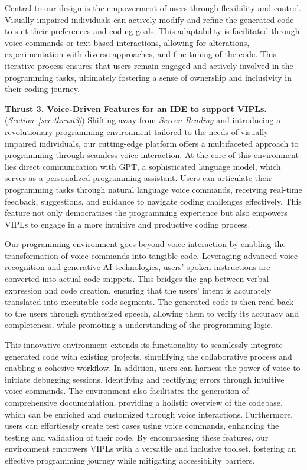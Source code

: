 Central to our design is the empowerment of users through flexibility
and control. Visually-impaired individuals can actively modify and
refine the generated code to suit their preferences and coding
goals. This adaptability is facilitated through voice commands or
text-based interactions, allowing for alterations, experimentation
with diverse approaches, and fine-tuning of the code. This iterative
process ensures that users remain engaged and actively involved in the
programming tasks, ultimately fostering a sense of ownership and
inclusivity in their coding journey.

\vspace{3pt}
\noindent \textbf{Thrust 3. Voice-Driven Features for an IDE to
  support VIPLs.} ({\em Section~\ref{sec:thrust3}}) Shifting away from
          {\em Screen Reading} and introducing a revolutionary
          programming environment tailored to the needs of
          visually-impaired individuals, our cutting-edge platform
          offers a multifaceted approach to programming through
          seamless voice interaction. At the core of this environment
          lies direct communication with GPT, a sophisticated language
          model, which serves as a personalized programming
          assistant. Users can articulate their programming tasks
          through natural language voice commands, receiving real-time
          feedback, suggestions, and guidance to navigate coding
          challenges effectively. This feature not only democratizes
          the programming experience but also empowers VIPLs to engage
          in a more intuitive and productive coding process.

Our programming environment goes beyond voice interaction by enabling
the transformation of voice commands into tangible code. Leveraging
advanced voice recognition and generative AI technologies, users'
spoken instructions are converted into actual code snippets. This
bridges the gap between verbal expression and code creation, ensuring
that the users' intent is accurately translated into executable code
segments. The generated code is then read back to the users through
synthesized speech, allowing them to verify its accuracy and
completeness, while promoting a understanding of the
programming logic.

This innovative environment extends its functionality to seamlessly
integrate generated code with existing projects, simplifying the
collaborative process and enabling a cohesive workflow. In addition,
users can harness the power of voice to initiate debugging sessions,
identifying and rectifying errors through intuitive voice
commands. The environment also facilitates the generation of
comprehensive documentation, providing a holistic overview of the
codebase, which can be enriched and customized through voice
interactions. Furthermore, users can effortlessly create test cases
using voice commands, enhancing the testing and validation of their
code. By encompassing these features, our environment
empowers VIPLs with a versatile and inclusive
toolset, fostering an effective programming journey while mitigating
accessibility barriers.


